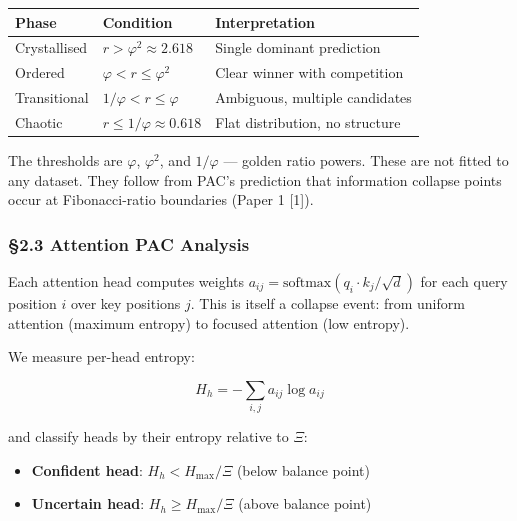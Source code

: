 \documentclass[
  11pt,
  a4paper]{article}
\providecommand{\tightlist}{%
  \setlength{\itemsep}{0pt}\setlength{\parskip}{0pt}}
\begin{document}
\begin{longtable}[]{@{}
  >{\raggedright\arraybackslash}p{}
  >{\raggedright\arraybackslash}p{}
  >{\raggedright\arraybackslash}p{}@{}}
\toprule\noalign{}
\begin{minipage}[b]{\linewidth}\raggedright
Phase
\end{minipage} & \begin{minipage}[b]{\linewidth}\raggedright
Condition
\end{minipage} & \begin{minipage}[b]{\linewidth}\raggedright
Interpretation
\end{minipage} \\
\midrule\noalign{}
\endhead
\bottomrule\noalign{}
\endlastfoot
Crystallised & \(r > \varphi^2 \approx 2.618\) & Single dominant
prediction \\
Ordered & \(\varphi < r \leq \varphi^2\) & Clear winner with
competition \\
Transitional & \(1/\varphi < r \leq \varphi\) & Ambiguous, multiple
candidates \\
Chaotic & \(r \leq 1/\varphi \approx 0.618\) & Flat distribution, no
structure \\
\end{longtable}

The thresholds are \(\varphi\), \(\varphi^2\), and \(1/\varphi\) ---
golden ratio powers. These are not fitted to any dataset. They follow
from PAC's prediction that information collapse points occur at
Fibonacci-ratio boundaries (Paper 1 {[}1{]}).

\subsubsection{§2.3 Attention PAC
Analysis}\label{attention-pac-analysis}

Each attention head computes weights
\(a_{ij} = \text{softmax}(q_i \cdot k_j / \sqrt{d})\) for each query
position \(i\) over key positions \(j\). This is itself a collapse
event: from uniform attention (maximum entropy) to focused attention
(low entropy).

We measure per-head entropy:

\[H_h = -\sum_{i,j} a_{ij} \log a_{ij}\]

and classify heads by their entropy relative to \(\Xi\):

\begin{itemize}
\tightlist
\item
  \textbf{Confident head}: \(H_h < H_\text{max} / \Xi\) (below balance
  point)
\item
  \textbf{Uncertain head}: \(H_h \geq H_\text{max} / \Xi\) (above
  balance point)
\end{itemize}
\end{document}
